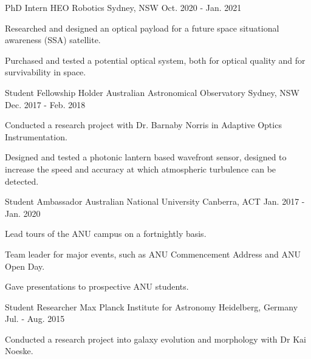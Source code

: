 \begin{cventries}
  \cventry
    {PhD Intern} %
    {HEO Robotics} %
    {Sydney, NSW} %
    {Oct. 2020 - Jan. 2021} %
    {
      \begin{cvitems} %
        \item {Researched and designed an optical payload for a future space situational awareness (SSA) satellite.}
        \item {Purchased and tested a potential optical system, both for optical quality and for survivability in space.}
      \end{cvitems}
    }

  \cventry
    {Student Fellowship Holder} %
    {Australian Astronomical Observatory} %
    {Sydney, NSW} %
    {Dec. 2017 - Feb. 2018} %
    {
      \begin{cvitems} %
        \item {Conducted a research project with Dr. Barnaby Norris in Adaptive Optics Instrumentation.}
        \item {Designed and tested a photonic lantern based wavefront sensor, designed to increase the speed and accuracy at which atmospheric turbulence can be detected.}
      \end{cvitems}
    }

  \cventry
    {Student Ambassador} %
    {Australian National University} %
    {Canberra, ACT} %
    {Jan. 2017 -  Jan. 2020} %
    {
      \begin{cvitems} %
        \item {Lead tours of the ANU campus on a fortnightly basis.}
        \item {Team leader for major events, such as ANU Commencement Address and ANU Open Day.}
        \item {Gave presentations to prospective ANU students.}
      \end{cvitems}
    }
    
  \cventry
    {Student Researcher} %
    {Max Planck Institute for Astronomy} %
    {Heidelberg, Germany} %
    {Jul. - Aug. 2015} %
    {
      \begin{cvitems} %
        \item {Conducted a research project into galaxy evolution and morphology with Dr Kai Noeske.}
      \end{cvitems}
    }
    

\end{cventries}
